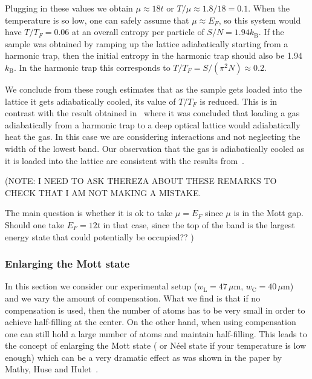 \documentclass[11pt,letter]{article}
\newcommand{\kb}{\ensuremath{k_{\text{B}}}}
\begin{document}
Plugging in these values we obtain $\mu\approx 18 t$  or $T/\mu \approx 1.8/18
= 0.1 $.  When the temperature is so low, one can safely assume that $\mu
\approx E_{F}$,  so this system would have  $T/T_{F}=0.06$ at an overall
entropy per particle of $S/N=1.94\kb$.  If the sample was obtained by ramping
up the lattice adiabatically starting from a harmonic trap, then the initial
entropy in the harmonic trap should also be 1.94\kb.  In the harmonic trap this
corresponds to $T/T_{F} = S/(\pi^{2} N) \approx 0.2$.  

We conclude from these rough estimates that as the sample gets loaded into the
lattice it gets adiabatically cooled, its value of $T/T_{F}$ is reduced.  This
is in contrast with the result obtained in~\cite{Kohl2006} where it was
concluded that loading a gas adiabatically from a harmonic trap to a deep
optical lattice would adiabatically heat the gas.   In this case we are
considering interactions and not neglecting the width of the lowest band.  Our
observation that the gas is adiabatically cooled as it is loaded into the
lattice are consistent with the results from~\cite{Paiva2011}.   

(NOTE: I NEED TO ASK THEREZA ABOUT THESE REMARKS TO CHECK THAT I AM NOT MAKING
A MISTAKE. 

The main question is whether it is ok to take $\mu=E_{F}$ since $\mu$ is in
the Mott gap.   Should one take  $E_{F}=12t$ in that case, since the top of the
band is the largest energy state that could potentially be occupied?? )


\subsubsection{ Enlarging the Mott state}  

In this section we consider our experimental setup
($w_{\text{L}}=47\,\mu\mathrm{m}$, $w_{\text{C}}=40\,\mu\mathrm{m}$)  and we
vary the amount of compensation.   What we find is that if no compensation is
used, then the number of atoms has to be very small in order to achieve
half-filling at the center.     On the other hand,  when using compensation one
can still hold a large number of atoms and maintain half-filling.   This leads
to the concept of enlarging the Mott state ( or N\'{e}el state if your
temperature is low enough)  which can be a very dramatic effect as was shown in
the paper by Mathy, Huse and Hulet~\cite{Mathy2012}.  
\end{document}
